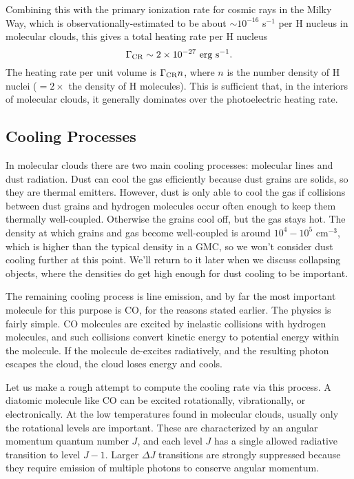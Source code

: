 Combining this with the primary ionization rate for cosmic rays in the Milky Way, which is observationally-estimated to be about  $\sim 10^{-16}$ s$^{-1}$ per H nucleus in molecular clouds, this gives a total heating rate per H nucleus
\begin{equation}
\Gamma_{\rm CR} \sim 2\times 10^{-27}\mbox{ erg s}^{-1}.
\end{equation}
The heating rate per unit volume is $\Gamma_{\rm CR} n$, where $n$ is the number density of H nuclei ($=2\times$ the density of H molecules). This is sufficient that, in the interiors of molecular clouds, it generally dominates over the photoelectric heating rate.

\subsection{Cooling Processes}

In molecular clouds there are two main cooling processes: molecular lines and dust radiation. Dust can cool the gas efficiently because dust grains are solids, so they are thermal emitters. However, dust is only able to cool the gas if collisions between dust grains and hydrogen molecules occur often enough to keep them thermally well-coupled. Otherwise the grains cool off, but the gas stays hot. The density at which grains and gas become well-coupled is around $10^4-10^5$ cm$^{-3}$, which is higher than the typical density in a GMC, so we won't consider dust cooling further at this point. We'll return to it later when we discuss collapsing objects, where the densities do get high enough for dust cooling to be important.

The remaining cooling process is line emission, and by far the most important molecule for this purpose is CO, for the reasons stated earlier. The physics is fairly simple. CO molecules are excited by inelastic collisions with hydrogen molecules, and such collisions convert kinetic energy to potential energy within the molecule. If the molecule de-excites radiatively, and the resulting photon escapes the cloud, the cloud loses energy and cools.

Let us make a rough attempt to compute the cooling rate via this process. A diatomic molecule like CO can be excited rotationally, vibrationally, or electronically. At the low temperatures found in molecular clouds, usually only the rotational levels are important. These are characterized by an angular momentum quantum number $J$, and each level $J$ has a single allowed radiative transition to level $J-1$. Larger $\Delta J$ transitions are strongly suppressed because they require emission of multiple photons to conserve angular momentum.

